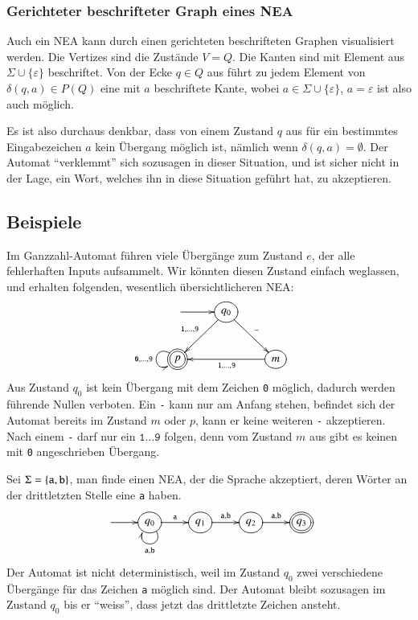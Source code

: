 \subsubsection{Gerichteter beschrifteter Graph eines NEA}
Auch ein NEA kann durch einen gerichteten beschrifteten Graphen
visualisiert werden.
Die Vertizes sind die Zustände $V=Q$.
Die Kanten sind mit Element aus $\Sigma\cup\{\varepsilon\}$ beschriftet.
Von der Ecke $q\in Q$ aus führt zu jedem Element von $\delta(q,a)\in P(Q)$
eine mit $a$ beschriftete Kante, wobei $a\in \Sigma\cup\{\varepsilon\}$, $a=\varepsilon$ ist also auch möglich.

Es ist also durchaus denkbar, dass von einem Zustand $q$ aus für ein
bestimmtes Eingabezeichen $a$ kein Übergang möglich ist, nämlich
wenn $\delta(q,a)=\emptyset$.
Der Automat ``verklemmt'' sich sozusagen in dieser Situation, und ist
sicher nicht in der Lage, ein Wort, welches
ihn in diese Situation geführt hat, zu akzeptieren.


\subsection{Beispiele}
\begin{beispiel}
Im Ganzzahl-Automat führen viele Übergänge zum Zustand $e$, der
alle fehlerhaften Inputs aufsammelt.
Wir könnten diesen Zustand einfach
weglassen, und erhalten folgenden, wesentlich übersichtlicheren NEA:
\[
\entrymodifiers={++[o][F]}
\xymatrix{
*+\txt{}\ar[r]
	&{q_0}  \ar[dl]_{{\tt 1},\dots,{\tt 9}} \ar[dr]^{\tt -}
\\
*++[o][F=]{p}\ar@(ul,dl)_{{\tt 0},\dots,{\tt 9}}
	&*+\txt{}
		&{m} \ar[ll]^{{\tt 1},\dots,{\tt 9}}
}
\]
Aus Zustand $q_0$ ist kein Übergang mit dem Zeichen {\tt 0} möglich,
dadurch werden führende Nullen verboten.
Ein {\tt -} kann nur am Anfang
stehen, befindet sich der Automat bereits im Zustand $m$ oder $p$, kann 
er keine weiteren {\tt -} akzeptieren.
Nach einem {\tt -} darf nur ein $\texttt{1}\dots\texttt{9}$ folgen,
denn vom Zustand $m$
aus gibt es keinen mit \texttt{0} angeschrieben Übergang.
\end{beispiel}

\begin{beispiel}
Sei $\Sigma=\{{\tt a},{\tt b}\}$, man finde einen NEA, der die 
Sprache akzeptiert, deren Wörter an der drittletzten Stelle
eine {\tt a} haben.
\[
\entrymodifiers={++[o][F]}
\xymatrix{
*+\txt{} \ar[r]
	&{q_0} \ar[r]^{\tt a} \ar@(dr,dl)^{{\tt a},{\tt b}}
		&{q_1}\ar[r]^{{\tt a},{\tt b}}
			&{q_2}\ar[r]^{{\tt a},{\tt b}}
				&*++[o][F=]{q_3}
}
\]
Der Automat ist nicht deterministisch, weil im Zustand $q_0$ zwei verschiedene
Übergänge für das Zeichen {\tt a} möglich sind.
Der Automat bleibt
sozusagen im Zustand $q_0$ bis er ``weiss'', dass jetzt das drittletzte
Zeichen ansteht.
\end{beispiel}


